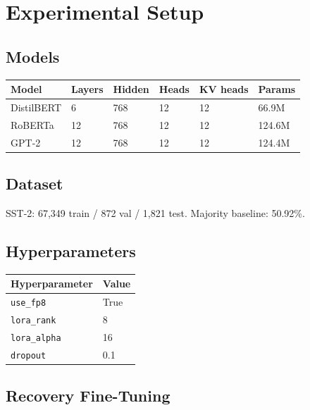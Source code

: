 \section{Experimental Setup}

\subsection{Models}

\begin{table}[H]
\centering
\small
\begin{tabular}{llllll}
\toprule
\textbf{Model} & \textbf{Layers} & \textbf{Hidden} & \textbf{Heads} & \textbf{KV heads} & \textbf{Params} \\
\midrule
DistilBERT & 6 & 768 & 12 & 12 & 66.9M \\
RoBERTa & 12 & 768 & 12 & 12 & 124.6M \\
GPT-2 & 12 & 768 & 12 & 12 & 124.4M \\
\bottomrule
\end{tabular}
\end{table}

\subsection{Dataset}

SST-2: 67,349 train / 872 val / 1,821 test. Majority baseline: 50.92\%.

\subsection{Hyperparameters}

\begin{table}[H]
\centering
\small
\begin{tabular}{ll}
\toprule
\textbf{Hyperparameter} & \textbf{Value} \\
\midrule
\texttt{use\_fp8} & True \\
\texttt{lora\_rank} & 8 \\
\texttt{lora\_alpha} & 16 \\
\texttt{dropout} & 0.1 \\
\bottomrule
\end{tabular}
\end{table}

\subsection{Recovery Fine-Tuning}

